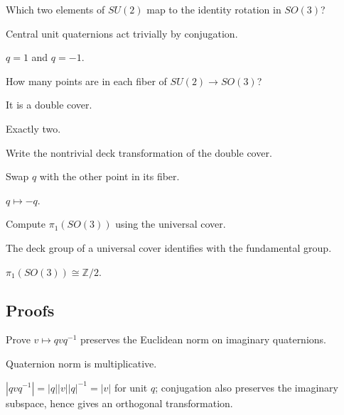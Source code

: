 \begin{exercise}\label{exr:viii13-ped-02}
Which two elements of $SU(2)$ map to the identity rotation in $SO(3)$?
\end{exercise}
\begin{hint}
Central unit quaternions act trivially by conjugation.
\end{hint}
\begin{solution}
$q=1$ and $q=-1$.
\end{solution}

\begin{exercise}\label{exr:viii13-ped-03}
How many points are in each fiber of $SU(2)\to SO(3)$?
\end{exercise}
\begin{hint}
It is a double cover.
\end{hint}
\begin{solution}
Exactly two.
\end{solution}

\begin{exercise}\label{exr:viii13-ped-04}
Write the nontrivial deck transformation of the double cover.
\end{exercise}
\begin{hint}
Swap $q$ with the other point in its fiber.
\end{hint}
\begin{solution}
$q\mapsto -q$.
\end{solution}

\begin{exercise}\label{exr:viii13-ped-05}
Compute $\pi_1(SO(3))$ using the universal cover.
\end{exercise}
\begin{hint}
The deck group of a universal cover identifies with the fundamental group.
\end{hint}
\begin{solution}
$\pi_1(SO(3))\cong\mathbb Z/2$.
\end{solution}

\subsection*{Proofs}

\begin{exercise}\label{exr:viii13-ped-06}
Prove $v\mapsto qvq^{-1}$ preserves the Euclidean norm on imaginary quaternions.
\end{exercise}
\begin{hint}
Quaternion norm is multiplicative.
\end{hint}
\begin{solution}
$|qvq^{-1}|=|q||v||q|^{-1}=|v|$ for unit $q$; conjugation also preserves the imaginary subspace, hence gives an orthogonal transformation.
\end{solution}

